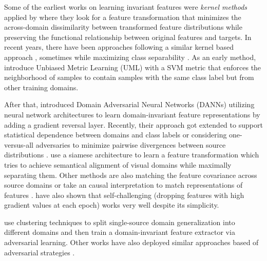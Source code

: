 Some of the earliest works on learning invariant features were \emph{kernel methods} applied by \citet{MuandetBS13}  where they look for a feature transformation that minimizes the across-domain dissimilarity between transformed feature distributions while preserving the functional relationship between original features and targets. In recent years, there have been approaches following a similar kernel based approach \citep{LiGTLT18, LiTGLLZT18}, sometimes while maximizing class separability \citep{Hu0CC19, GhifaryBKZ17}. As an early method, \citet{FangXR13} introduce Unbiased Metric Learning (UML) with a SVM metric that enforces the neighborhood of samples to contain samples with the same class label but from other training domains.

After that, \citet{GaninUAGLLML16} introduced Domain Adversarial Neural Networks (DANNs) utilizing neural network architectures to learn domain-invariant feature representations by adding a gradient reversal layer. Recently, their approach got extended to support statistical dependence between domains and class labels \citep{AkuzawaIM19} or considering one-versus-all adversaries to minimize pairwise divergences between source distributions \citep{albuquerque2019generalizing}. \citet{MotiianPAD17} use a siamese architecture to learn a feature transformation which tries to achieve semantical alignment of visual domains while maximally separating them. Other methods are also matching the feature covariance across source domains \citep{RahmanFBS20} or take an causal interpretation to match representations of features \citep{mahajan2020domain}. \citet{huang2020selfchallenging} have also shown that self-challenging (\ie dropping features with high gradient values at each epoch) works very well despite its simplicity. 

\citet{MatsuuraH20} use clustering techniques to split single-source domain generalization into different domains and then train a domain-invariant feature extractor via adversarial
learning. Other works have also deployed similar approaches based of adversarial strategies \citep{deng2020representation, Jia_2020_CVPR_SSDG}.

